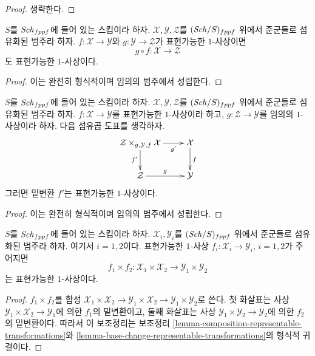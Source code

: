\begin{proof}
생략한다.
\end{proof}

\begin{lemma}
\label{lemma-composition-representable-transformations}
$S$를 $\mathit{Sch}_{fppf}$에 들어 있는 스킴이라 하자.
$\mathcal{X}, \mathcal{Y}, \mathcal{Z}$를 $(\mathit{Sch}/S)_{fppf}$ 위에서
준군들로 섬유화된 범주라 하자. $f : \mathcal{X} \to \mathcal{Y}$와
$g : \mathcal{Y} \to \mathcal{Z}$가 표현가능한 $1$-사상이면
$$
g \circ f : \mathcal{X} \longrightarrow \mathcal{Z}
$$
도 표현가능한 $1$-사상이다.
\end{lemma}

\begin{proof}
이는 완전히 형식적이며 임의의 범주에서 성립한다.
\end{proof}

\begin{lemma}
\label{lemma-base-change-representable-transformations}
$S$를 $\mathit{Sch}_{fppf}$에 들어 있는 스킴이라 하자.
$\mathcal{X}, \mathcal{Y}, \mathcal{Z}$를 $(\mathit{Sch}/S)_{fppf}$ 위에서
준군들로 섬유화된 범주라 하자. $f : \mathcal{X} \to \mathcal{Y}$를
표현가능한 $1$-사상이라 하고, $g : \mathcal{Z} \to \mathcal{Y}$를
임의의 $1$-사상이라 하자. 다음 섬유곱 도표를 생각하자.
$$
\xymatrix{
\mathcal{Z} \times_{g, \mathcal{Y}, f} \mathcal{X} \ar[r]_-{g'} \ar[d]_{f'} &
\mathcal{X} \ar[d]^f \\
\mathcal{Z} \ar[r]^g & \mathcal{Y}
}
$$
그러면 밑변환 $f'$는 표현가능한 $1$-사상이다.
\end{lemma}

\begin{proof}
이는 완전히 형식적이며 임의의 범주에서 성립한다.
\end{proof}

\begin{lemma}
\label{lemma-product-representable-transformations}
$S$를 $\mathit{Sch}_{fppf}$에 들어 있는 스킴이라 하자.
$\mathcal{X}_i, \mathcal{Y}_i$를 $(\mathit{Sch}/S)_{fppf}$ 위에서 준군들로
섬유화된 범주라 하자. 여기서 $i = 1, 2$이다. 표현가능한 $1$-사상
$f_i : \mathcal{X}_i \to \mathcal{Y}_i$, $i = 1, 2$가 주어지면
$$
f_1 \times f_2 :
\mathcal{X}_1 \times \mathcal{X}_2
\longrightarrow
\mathcal{Y}_1 \times \mathcal{Y}_2
$$
는 표현가능한 $1$-사상이다.
\end{lemma}

\begin{proof}
$f_1 \times f_2$를 합성
$\mathcal{X}_1 \times \mathcal{X}_2 \to
\mathcal{Y}_1 \times \mathcal{X}_2 \to
\mathcal{Y}_1 \times \mathcal{Y}_2$로 쓴다. 첫 화살표는 사상
$\mathcal{Y}_1 \times \mathcal{X}_2 \to \mathcal{Y}_1$에 의한
$f_1$의 밑변환이고, 둘째 화살표는 사상
$\mathcal{Y}_1 \times \mathcal{Y}_2 \to \mathcal{Y}_2$에 의한
$f_2$의 밑변환이다. 따라서 이 보조정리는 보조정리
\ref{lemma-composition-representable-transformations}와
\ref{lemma-base-change-representable-transformations}의 형식적 귀결이다.
\end{proof}



